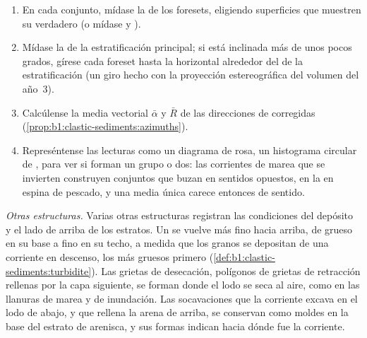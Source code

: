 \begin{method}\label{met:b1:clastic-sediments:palaeocurrent}
\begin{enumerate}
  \item En cada conjunto, mídase la  de los foresets, eligiendo superficies que muestren su  verdadero (o mídase  y ).
  \item Mídase la  de la estratificación principal; si está inclinada más de unos pocos grados, gírese cada foreset hasta la horizontal alrededor del  de la
        estratificación (un giro hecho con la proyección estereográfica del volumen del año~3).
  \item Calcúlense la media vectorial $\bar\alpha$ y $\bar R$ de las direcciones de  corregidas (\cref{prop:b1:clastic-sediments:azimuths}).
  \item Represéntense las lecturas como un diagrama de rosa, un histograma circular de , para ver si forman un grupo o dos: las corrientes de marea que se invierten
        construyen conjuntos que buzan en sentidos opuestos, en la  en espina de pescado, y una media única carece entonces de sentido.
\end{enumerate}
\end{method}

\emph{Otras estructuras.} Varias otras estructuras registran las condiciones del depósito y el lado de arriba de los estratos. Un  se vuelve más fino hacia
arriba, de grueso en su base a fino en su techo, a medida que los granos se depositan de una corriente en descenso, los más gruesos primero (\cref{def:b1:clastic-sediments:turbidite}).
Las grietas de desecación, polígonos de grietas de retracción rellenas por la capa siguiente, se forman donde el lodo se seca al aire, como en las llanuras de marea y de inundación.
Las socavaciones que la corriente excava en el lodo de abajo, y que rellena la arena de arriba, se conservan como moldes en la base del estrato de arenisca, y sus formas indican
hacia dónde fue la corriente.

